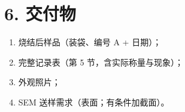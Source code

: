 \documentclass[a4paper, 11pt]{ctexart}
\begin{document}
\section*{6. 交付物}
\begin{enumerate}
  \item 烧结后样品（装袋、编号 A + 日期）；
  \item 完整记录表（第 5 节，含实际称量与现象）；
  \item 外观照片；
  \item SEM 送样需求（表面；有条件加截面）。
\end{enumerate}
\end{document}

